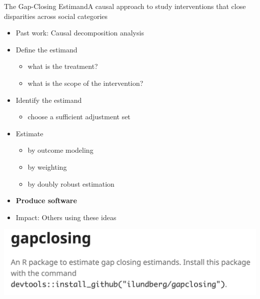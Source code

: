 \documentclass{beamer}
\newcommand\bblue[1]{{\color{blue}\textbf{#1}}}
\begin{document}
{\begin{frame}
\end{frame}

\begin{frame}{The Gap-Closing Estimand}{A causal approach to study interventions that close disparities across social categories}
	\begin{itemize}
		\item Past work: Causal decomposition analysis
		\item Define the estimand
		\begin{itemize}
			\item what is the treatment?
			\item what is the scope of the intervention?
		\end{itemize}
		\item Identify the estimand
		\begin{itemize}
			\item choose a sufficient adjustment set
		\end{itemize}
		\item Estimate
		\begin{itemize}
			\item by outcome modeling
			\item by weighting
			\item by doubly robust estimation
		\end{itemize}
		\item \bblue{Produce software}
		\item Impact: Others using these ideas
	\end{itemize}
\end{frame}

\begin{frame}[t,fragile]
\includegraphics[width = .8\textwidth]{figures/gapclosing_package}


\end{frame}}
\end{document}
